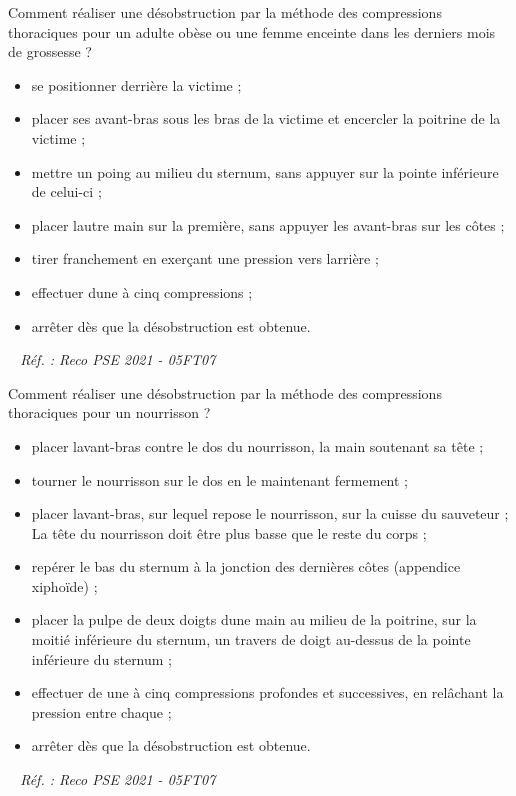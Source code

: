 \documentclass[grid,avery5371,landscape]{flashcards}
\makeatletter
\newcounter{nocarte}
\newcommand{\categ}[1]{%
  \def\@categ{#1}%
  \setcounter{nocarte}{0}%
}
\newcommand{\source}[1]{%
  \medskip
  \itshape%
   ~ \hfill Réf. : #1}
\makeatother
\begin{document}
\color[HTML]{003273}
\categ{PSE}
\begin{flashcard}[geste]{
 Comment réaliser une désobstruction par la méthode des compressions thoraciques pour un adulte obèse ou une femme enceinte dans les derniers mois de grossesse ?   }
  \begin{itemize}
\item se positionner derrière la victime ;
\item  placer ses avant-bras sous les bras de la victime et encercler la poitrine de la victime ;
\item  mettre un poing au milieu du sternum, sans appuyer sur la pointe inférieure de celui-ci ;
\item  placer lautre main sur la première, sans appuyer les avant-bras sur les côtes ;
\item tirer franchement en exerçant une pression vers larrière ;
\item  effectuer dune à cinq compressions ;
\item  arrêter dès que la désobstruction est obtenue. \end{itemize}
  \source{Reco PSE 2021 - 05FT07}
\end{flashcard}


\color[HTML]{003273}
\categ{PSE}
\begin{flashcard}[geste]{
 Comment réaliser une désobstruction par la méthode des compressions thoraciques pour un nourrisson ?   }
  \begin{itemize}
\item placer lavant-bras contre le dos du nourrisson, la main soutenant sa tête ;
\item tourner le nourrisson sur le dos en le maintenant fermement ;
\item placer lavant-bras, sur lequel repose le nourrisson, sur la cuisse du sauveteur ; La tête du nourrisson doit être plus basse que le reste du corps ;
\item repérer le bas du sternum à la jonction des dernières côtes (appendice xiphoïde) ;
\item placer la pulpe de deux doigts dune main au milieu de la poitrine, sur la moitié inférieure du sternum, un travers de doigt au-dessus de la pointe inférieure du sternum ;
\item effectuer de une à cinq compressions profondes et successives, en relâchant la pression entre chaque ;
\item arrêter dès que la désobstruction est obtenue.
\end{itemize}
  \source{Reco PSE 2021 - 05FT07}
\end{flashcard}
\end{document}
